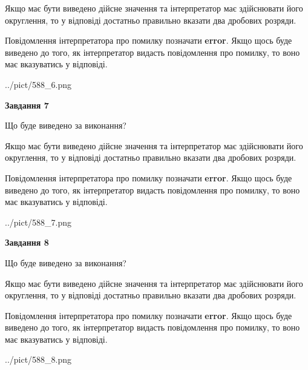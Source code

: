 \documentclass[12pt, ukrainian]{article}
\begin{document}
{\begin {Large}
Якщо має бути виведено дійсне значення та інтерпретатор має здійснювати його округлення, 
то у відповіді достатньо правильно вказати два дробових розряди.

Повідомлення інтерпретатора про помилку позначати \textbf{error}.
Якщо щось буде виведено до того, як інтерпретатор видасть повідомлення про помилку, 
то воно має вказуватись у відповіді. \par

\begin{center}
	{../pict/588_6.png}
\end{center}
\newpage

{\begin {center}\textbf{Завдання 7}\end {center}}\par
Що буде виведено за виконання? \par

Якщо має бути виведено дійсне значення та інтерпретатор має здійснювати його округлення, 
то у відповіді достатньо правильно вказати два дробових розряди.

Повідомлення інтерпретатора про помилку позначати \textbf{error}.
Якщо щось буде виведено до того, як інтерпретатор видасть повідомлення про помилку, 
то воно має вказуватись у відповіді. \par

\begin{center}
	{../pict/588_7.png}
\end{center}
\newpage

{\begin {center}\textbf{Завдання 8}\end {center}}\par
Що буде виведено за виконання? \par

Якщо має бути виведено дійсне значення та інтерпретатор має здійснювати його округлення, 
то у відповіді достатньо правильно вказати два дробових розряди.

Повідомлення інтерпретатора про помилку позначати \textbf{error}.
Якщо щось буде виведено до того, як інтерпретатор видасть повідомлення про помилку, 
то воно має вказуватись у відповіді. \par

\begin{center}
	{../pict/588_8.png}
\end{center}
\newpage


\end{Large}}
\end{document}
